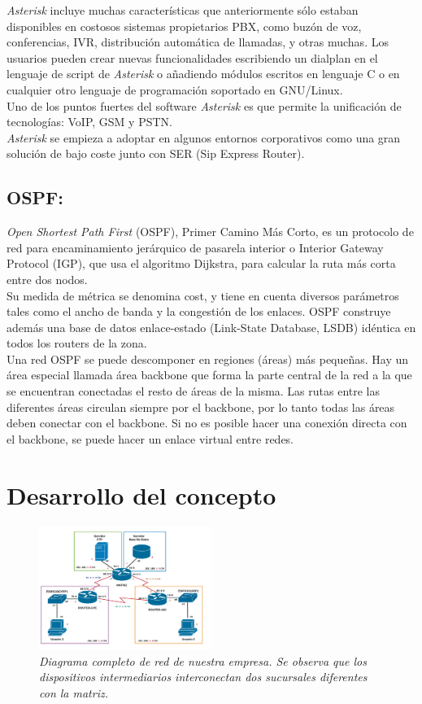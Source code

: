 \documentclass[conference]{IEEEtran}
\begin{document}
\textit{Asterisk} incluye muchas características que anteriormente sólo estaban disponibles en costosos sistemas propietarios PBX, como buzón de voz, conferencias, IVR, distribución automática de llamadas, y otras muchas. Los usuarios pueden crear nuevas funcionalidades escribiendo un dialplan en el lenguaje de script de \textit{Asterisk} o añadiendo módulos escritos en lenguaje C o en cualquier otro lenguaje de programación soportado en GNU/Linux.\\
Uno de los puntos fuertes del software \textit{Asterisk} es que permite la unificación de tecnologías: VoIP, GSM y PSTN.\\
\textit{Asterisk} se empieza a adoptar en algunos entornos corporativos como una gran solución de bajo coste junto con SER (Sip Express Router).


\subsection{\textbf{ OSPF:}}
\textit{Open Shortest Path First} (OSPF), Primer Camino Más Corto, es un protocolo de red para encaminamiento jerárquico de pasarela interior o Interior Gateway Protocol (IGP), que usa el algoritmo Dijkstra, para calcular la ruta más corta entre dos nodos.\\
Su medida de métrica se denomina cost, y tiene en cuenta diversos parámetros tales como el ancho de banda y la congestión de los enlaces. OSPF construye además una base de datos enlace-estado (Link-State Database, LSDB) idéntica en todos los routers de la zona.\\
Una red OSPF se puede descomponer en regiones (áreas) más pequeñas. Hay un área especial llamada área backbone que forma la parte central de la red a la que se encuentran conectadas el resto de áreas de la misma. Las rutas entre las diferentes áreas circulan siempre por el backbone, por lo tanto todas las áreas deben conectar con el backbone. Si no es posible hacer una conexión directa con el backbone, se puede hacer un enlace virtual entre redes.

\section{Desarrollo del concepto}\label{sec:ddc}
\begin{figure}[h]
	\centerline{\includegraphics[width=0.50\textwidth]{img/desa01.png}}
	\caption{\textit{Diagrama completo de red de nuestra empresa. Se observa que los dispositivos intermediarios interconectan dos sucursales diferentes con la matriz.}}
	\label{fig:ddc01}
\end{figure}
\end{document}

